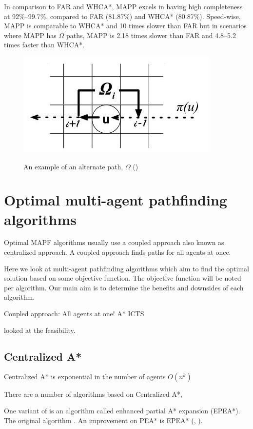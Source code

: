 \documentclass[a4paper,11pt]{article}
\begin{document}
In comparison to FAR and WHCA*, MAPP excels in having high completeness at 92\%--99.7\%, compared to FAR (81.87\%) and WHCA* (80.87\%). Speed-wise, MAPP is comparable to WHCA* and 10 times slower than FAR  but in scenarios where MAPP has $\Omega$ paths, MAPP is 2.18 times slower than FAR and 4.8--5.2 times faster than WHCA*.



\begin{figure}[H]
	\centering
	\includegraphics[width=0.4\linewidth]{graphics/omegapath}
	\label{fig:omegapath}
	\caption{An example of an alternate path, $\Omega$ (\cite{wang2011mapp})}
\end{figure}


\section{Optimal multi-agent pathfinding algorithms} \label{sec:optimal}
Optimal MAPF algorithms usually use a coupled approach also known as centralized approach. A coupled approach finds paths for all agents at once. 




Here we look at multi-agent pathfinding algorithms which aim to find the optimal solution based on some objective function. The objective function will be noted per algorithm. Our main aim is to determine the benefits and downsides of each algorithm.


Coupled approach: All agents at one! A* ICTS

\cite{krontiris2013feasibility} looked at the feasibility.

\subsection{Centralized A*}
Centralized A* is exponential in the number of agents $O(n^k)$

There are a number of algorithms based on Centralized A*, 

One variant of is an algorithm called enhanced partial A* expansion (EPEA*). The original algorithm \cite{yoshizumi2000partial}. An improvement on PEA* is EPEA* (\cite{felner2012partial}, \cite{goldenberg2014enhanced}).
\end{document}
